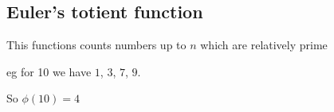 
\subsection{Euler's totient function}

This functions counts numbers up to \(n\) which are relatively prime

eg for 10 we have \(1\), \(3\), \(7\), \(9\).

So \(\phi (10)=4\)

